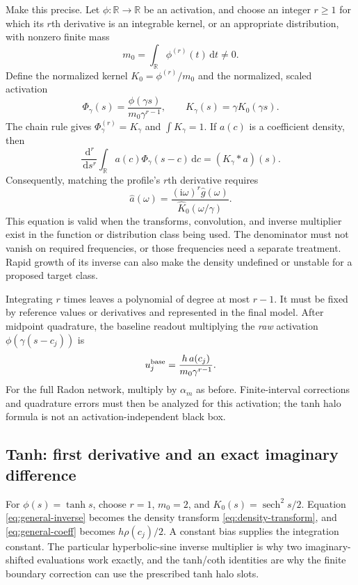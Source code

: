 \documentclass[11pt]{article}
\newcommand{\R}{\mathbb R}
\newcommand{\ii}{\mathrm i}
\newcommand{\dd}{\,\mathrm d}
\newcommand{\sech}{\operatorname{sech}}
\begin{document}
Make this precise. Let $\phi:\R\to\R$ be an activation, and choose an integer $r\ge1$ for which its $r$th derivative is an integrable kernel, or an appropriate distribution, with nonzero finite mass
\[
 m_0=\int_\R\phi^{(r)}(t)\dd t\ne0.
\]
Define the normalized kernel $K_0=\phi^{(r)}/m_0$ and the normalized, scaled activation
\[
 \Phi_\gamma(s)=\frac{\phi(\gamma s)}{m_0\gamma^{r-1}},\qquad
 K_\gamma(s)=\gamma K_0(\gamma s).
\]
The chain rule gives $\Phi_\gamma^{(r)}=K_\gamma$ and $\int K_\gamma=1$. If $a(c)$ is a coefficient density, then
\[
 \frac{\dd^r}{\dd s^r}\int_\R a(c)\Phi_\gamma(s-c)\dd c
 =(K_\gamma*a)(s).
\]
Consequently, matching the profile's $r$th derivative requires
\begin{equation}
 \widehat a(\omega)=
 \frac{(\ii\omega)^r\widehat g(\omega)}{\widehat K_0(\omega/\gamma)}.
 \label{eq:general-inverse}
\end{equation}
This equation is valid when the transforms, convolution, and inverse multiplier exist in the function or distribution class being used. The denominator must not vanish on required frequencies, or those frequencies need a separate treatment. Rapid growth of its inverse can also make the density undefined or unstable for a proposed target class.

Integrating $r$ times leaves a polynomial of degree at most $r-1$. It must be fixed by reference values or derivatives and represented in the final model. After midpoint quadrature, the baseline readout multiplying the \emph{raw} activation $\phi(\gamma(s-c_j))$ is
\begin{equation}
 u_j^{\rm base}=\frac{h\,a(c_j)}{m_0\gamma^{r-1}}.
 \label{eq:general-coeff}
\end{equation}
For the full Radon network, multiply by $\alpha_m$ as before. Finite-interval corrections and quadrature errors must then be analyzed for this activation; the tanh halo formula is not an activation-independent black box.

\subsection{Tanh: first derivative and an exact imaginary difference}
For $\phi(s)=\tanh s$, choose $r=1$, $m_0=2$, and
$K_0(s)=\sech^2s/2$. Equation \eqref{eq:general-inverse} becomes the density transform \eqref{eq:density-transform}, and \eqref{eq:general-coeff} becomes $h\rho(c_j)/2$. A constant bias supplies the integration constant. The particular hyperbolic-sine inverse multiplier is why two imaginary-shifted evaluations work exactly, and the tanh/coth identities are why the finite boundary correction can use the prescribed tanh halo slots.
\end{document}
